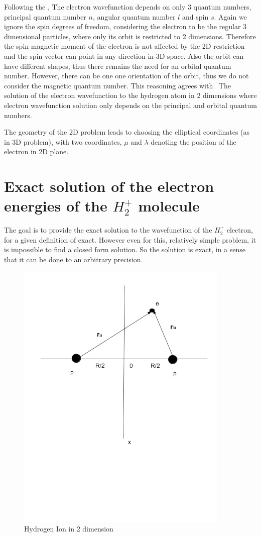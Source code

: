 Following the \cite{2DHAtom}, The electron wavefunction depends on only 3 quantum numbers, principal quantum number $ n $, angular quantum number $ l $ and spin $ s $. Again we ignore the spin degrees of freedom, considering the electron to be the regular 3 dimensional particles, where only its orbit is restricted to 2 dimensions.  Therefore the spin magnetic moment of the electron is not affected by the 2D restriction and the spin vector can point in any direction in 3D space. Also the orbit can have different shapes, thus there remains the need for an orbital quantum number. However, there can be one one orientation of the orbit, thus we do not consider the magnetic quantum number. This reasoning agrees with ~The solution of the electron wavefunction to the hydrogen atom in 2 dimensions \cite{H2atom} where electron wavefunction solution only depends on the principal and orbital quantum numbers.

The geometry of the 2D problem leads to choosing the elliptical coordinates (as in 3D problem), with two coordinates, $ \mu $ and $ \lambda $ denoting the position of the electron in 2D plane. \cite{Arfken}

\section{Exact solution of the electron energies of the \texorpdfstring{$ H_2^+ $}{$H_2^+$} molecule}

The goal is to provide the exact solution to the wavefunction of the $ H_2^{+} $ electron, for a given definition of exact. However even for this, relatively simple problem, it is impossible to find a closed form solution. So the solution is exact, in a sense that it can be done to an arbitrary precision.

\begin{figure}
 \captionsetup{type=figure}
  \includegraphics{H2Ion2D.png}
  \caption{Hydrogen Ion in 2 dimension} 
  \label{h2ion2d}
\end{figure}

